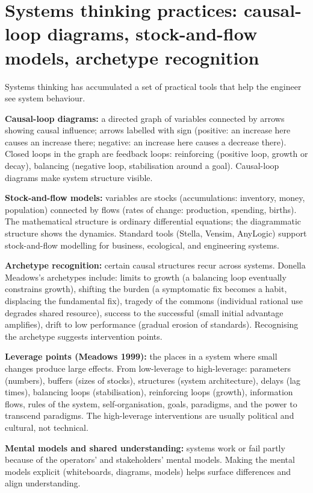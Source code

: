 \section{Systems thinking practices: causal-loop diagrams, stock-and-flow models, archetype recognition}

Systems thinking has accumulated a set of practical tools that help the engineer see system behaviour.

\textbf{Causal-loop diagrams:} a directed graph of variables connected by arrows showing causal influence; arrows labelled with sign (positive: an increase here causes an increase there; negative: an increase here causes a decrease there). Closed loops in the graph are feedback loops: reinforcing (positive loop, growth or decay), balancing (negative loop, stabilisation around a goal). Causal-loop diagrams make system structure visible.

\textbf{Stock-and-flow models:} variables are stocks (accumulations: inventory, money, population) connected by flows (rates of change: production, spending, births). The mathematical structure is ordinary differential equations; the diagrammatic structure shows the dynamics. Standard tools (Stella, Vensim, AnyLogic) support stock-and-flow modelling for business, ecological, and engineering systems.

\textbf{Archetype recognition:} certain causal structures recur across systems. Donella Meadows's archetypes include: limits to growth (a balancing loop eventually constrains growth), shifting the burden (a symptomatic fix becomes a habit, displacing the fundamental fix), tragedy of the commons (individual rational use degrades shared resource), success to the successful (small initial advantage amplifies), drift to low performance (gradual erosion of standards). Recognising the archetype suggests intervention points.

\textbf{Leverage points (Meadows 1999):} the places in a system where small changes produce large effects. From low-leverage to high-leverage: parameters (numbers), buffers (sizes of stocks), structures (system architecture), delays (lag times), balancing loops (stabilisation), reinforcing loops (growth), information flows, rules of the system, self-organisation, goals, paradigms, and the power to transcend paradigms. The high-leverage interventions are usually political and cultural, not technical.

\textbf{Mental models and shared understanding:} systems work or fail partly because of the operators' and stakeholders' mental models. Making the mental models explicit (whiteboards, diagrams, models) helps surface differences and align understanding.

